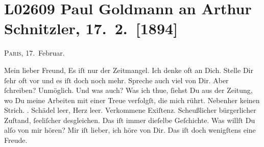 

\section[Paul Goldmann an Arthur Schnitzler, 17. 2. {[}1894{]}]{L02609 Paul Goldmann an Arthur Schnitzler, 17. 2. {[}1894{]}}
\nopagebreak{}
\rehead{ }\normalsize\beginnumbering{}
\toendnotes[C]{\smallbreak\pagebreak[2]}
\toendnotes[C]{\smallbreak}
\pstart
           \raggedleft{}{\pb}\textsc{Paris}, 17. Februar.\pend
           
\pstart\center{}Mein lieber Freund,\pend\vspace{0.5em}
\pstart
           Es iſt nur der Zeitmangel. Ich denke oft an Dich. Stelle Dir ſehr oft vor und es iſt
               doch noch mehr. Spreche auch viel von Dir. Aber ſchreiben? Unmöglich. Und was auch?
               Was ich thue, ſiehst Du aus der Zeitung, wo Du meine Arbeiten mit einer Treue verfolgſt, die mich rührt.
               Nebenher keinen Strich. \textsc{\label{K_L02609-1v}\label{K_L02609-1}}. Schädel leer, Herz leer. Verkommene Exiſtenz. Scheußlicher bürgerlicher
               Zuſtand, ſeeliſcher desgleichen. {\pb}Das iſt immer
               dieſelbe Geſchichte. Was willſt Du alſo von mir hören? Mir iſt lieber, ich höre von
               Dir. Das iſt doch wenigſtens eine Freude.\pend
           
